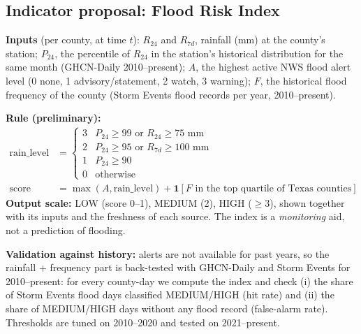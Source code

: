 \documentclass[11pt,letterpaper]{article}
\begin{document}
\subsection{Indicator proposal: Flood Risk Index}
\textbf{Inputs} (per county, at time $t$): $R_{24}$ and $R_{7d}$, rainfall (mm) at the county's station; $P_{24}$, the percentile of $R_{24}$ in the station's historical distribution for the same month (GHCN-Daily 2010--present); $A$, the highest active NWS flood alert level (0 none, 1 advisory/statement, 2 watch, 3 warning); $F$, the historical flood frequency of the county (Storm Events flood records per year, 2010--present).

\textbf{Rule (preliminary):}
\begin{align*}
\text{rain\_level} &= \begin{cases} 3 & P_{24} \geq 99 \text{ or } R_{24} \geq 75\text{ mm}\\ 2 & P_{24} \geq 95 \text{ or } R_{7d} \geq 100\text{ mm}\\ 1 & P_{24} \geq 90 \\ 0 & \text{otherwise}\end{cases}\\
\text{score} &= \max(A, \text{rain\_level}) + \mathbf{1}[F \text{ in the top quartile of Texas counties}]
\end{align*}
\textbf{Output scale:} LOW (score 0--1), MEDIUM (2), HIGH ($\geq$3), shown together with its inputs and the freshness of each source. The index is a \emph{monitoring} aid, not a prediction of flooding.

\textbf{Validation against history:} alerts are not available for past years, so the rainfall + frequency part is back-tested with GHCN-Daily and Storm Events for 2010--present: for every county-day we compute the index and check (i) the share of Storm Events flood days classified MEDIUM/HIGH (hit rate) and (ii) the share of MEDIUM/HIGH days without any flood record (false-alarm rate). Thresholds are tuned on 2010--2020 and tested on 2021--present.
\end{document}
